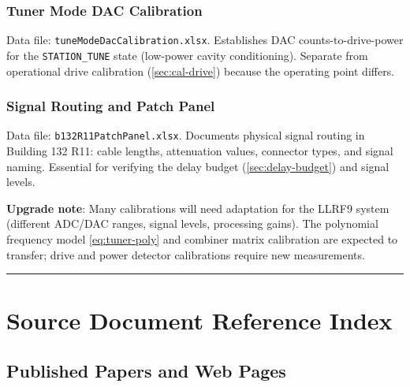 \subsubsection{Tuner Mode DAC Calibration}\label{sec:cal-tunemode}


Data file: \texttt{tuneModeDacCalibration.\allowbreak{}xlsx}. Establishes DAC counts-to-drive-power for the \texttt{STATION\_TUNE} state (low-power cavity conditioning). Separate from operational drive calibration (\cref{sec:cal-drive}) because the operating point differs.

\subsubsection{Signal Routing and Patch Panel}\label{sec:cal-routing}


Data file: \texttt{b132R11PatchPanel.\allowbreak{}xlsx}. Documents physical signal routing in Building 132 R11: cable lengths, attenuation values, connector types, and signal naming. Essential for verifying the delay budget (\cref{sec:delay-budget}) and signal levels.

\begin{keynote}
\textbf{Upgrade note}: Many calibrations will need adaptation for the LLRF9 system (different ADC/DAC ranges, signal levels, processing gains). The polynomial frequency model \eqref{eq:tuner-poly} and combiner matrix calibration are expected to transfer; drive and power detector calibrations require new measurements.
\end{keynote}

\begin{center}\rule{0.5\linewidth}{0.5pt}\end{center}

\appendix

\section{Source Document Reference Index}\label{app:refs}


\subsection{Published Papers and Web Pages}\label{sec:b1-papers}


